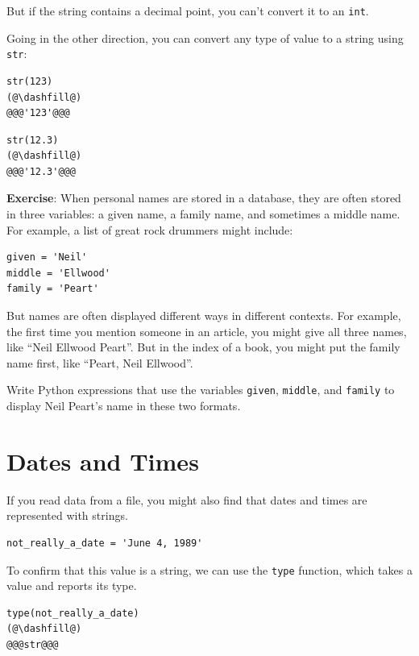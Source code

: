 But if the string contains a decimal point, you can't convert it to an
\passthrough{\lstinline!int!}.

Going in the other direction, you can convert any type of value to a
string using \passthrough{\lstinline!str!}:

\begin{lstlisting}[]
str(123)
(@\dashfill@)
@@@'123'@@@
\end{lstlisting}

\begin{lstlisting}[]
str(12.3)
(@\dashfill@)
@@@'12.3'@@@
\end{lstlisting}

\textbf{Exercise}: When personal names are stored in a database, they
are often stored in three variables: a given name, a family name, and
sometimes a middle name. For example, a list of great rock drummers
might include:

\begin{lstlisting}[]
given = 'Neil'
middle = 'Ellwood'
family = 'Peart'
\end{lstlisting}

But names are often displayed different ways in different contexts. For
example, the first time you mention someone in an article, you might
give all three names, like ``Neil Ellwood Peart''. But in the index of a
book, you might put the family name first, like ``Peart, Neil Ellwood''.

Write Python expressions that use the variables
\passthrough{\lstinline!given!}, \passthrough{\lstinline!middle!}, and
\passthrough{\lstinline!family!} to display Neil Peart's name in these
two formats.

\hypertarget{dates-and-times}{%
\section{Dates and Times}\label{dates-and-times}}

If you read data from a file, you might also find that dates and times
are represented with strings.

\begin{lstlisting}[]
not_really_a_date = 'June 4, 1989'
\end{lstlisting}

To confirm that this value is a string, we can use the
\passthrough{\lstinline!type!} function, which takes a value and reports
its type.

\begin{lstlisting}[]
type(not_really_a_date)
(@\dashfill@)
@@@str@@@
\end{lstlisting}

